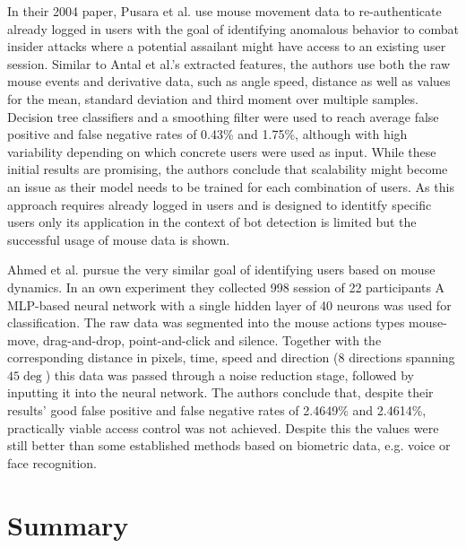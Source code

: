 \documentclass[
    fontsize=12pt,
    headings=small,
    parskip=half,           %
    bibliography=totoc,
    numbers=noenddot,       %
    open=any,               %
    final,                   %
    table
]{scrreprt}
\begin{document}
In their 2004 paper, Pusara et al. \cite{10.1145/1029208.1029210} use mouse movement data to re-authenticate already logged in users with the goal of identifying anomalous behavior to combat insider attacks where a potential assailant might have access to an existing user session. Similar to Antal et al.'s \cite{https://doi.org/10.1049/iet-bmt.2018.5126} extracted features, the authors use both the raw mouse events and derivative data, such as angle speed, distance as well as values for the mean, standard deviation and third moment over multiple samples. Decision tree classifiers and a smoothing filter were used to reach average false positive and false negative rates of 0.43\% and 1.75\%, although with high variability depending on which concrete users were used as input. While these initial results are promising, the authors conclude that scalability might become an issue as their model needs to be trained for each combination of users. As this approach requires already logged in users and is designed to identitfy specific users only its application in the context of bot detection is limited but the successful usage of mouse data is shown.

Ahmed et al. pursue the very similar goal of identifying users based on mouse dynamics. In an own experiment they collected 998 session of 22 participants
A MLP-based neural network with a single hidden layer of 40 neurons was used for classification. The raw data was segmented into the mouse actions types mouse-move, drag-and-drop, point-and-click and silence. Together with the corresponding distance in pixels, time, speed and direction (8 directions spanning $45\deg$) this data was passed through a noise reduction stage, followed by inputting it into the neural network. The authors conclude that, despite their results' good false positive and false negative rates of 2.4649\% and 2.4614\%, practically viable access control was not achieved. Despite this the values were still better than some established methods based on biometric data, e.g. voice or face recognition.

\section{Summary}
\end{document}
